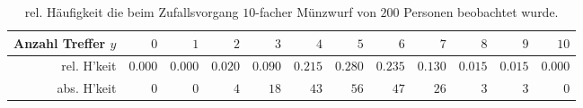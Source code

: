 \documentclass[11pt]{article}
\begin{document}
\begin{enumerate}
 	\begin{table}[h]
 	 \centering 
 \small %
\begin{tabular}{|r|r|r|r|r|r|r|r|r|r|r|r|}
  \hline
   Anzahl Treffer  $y$                               & $0$    &   $1$    & $2$   & $3$   & $4$   & $5$ &   $6$    & $7$   & $8$   & $9$   & $10$\\ \hline
   rel. H'keit & $0.000$ & $0.000$ & $0.020$ & $0.090$ & $0.215$ & $0.280$ & $0.235$ & $0.130$ & $0.015$ & $0.015$ & $0.000$  \\ \hline
    abs. H'keit & $0$ & $0$ & $4$ & $18$ & $43$ & $56$ & $47$ & $26$ & $3$ & $3$ & $0$  \\ \hline
\end{tabular}
 \caption{rel. Häufigkeit die beim Zufallsvorgang $10$-facher Münzwurf von $200$ Personen beobachtet wurde. \label{tab2}}
 \end{table}  



\end{enumerate}
\end{document}
